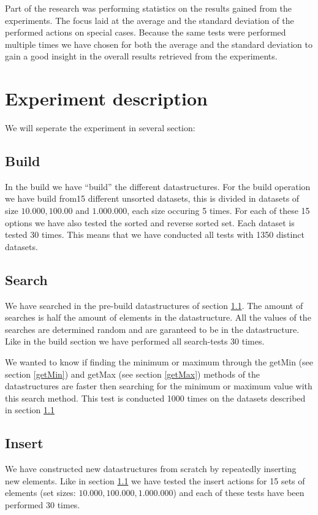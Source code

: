 \documentclass{article}
\begin{document}
Part of the research was performing statistics on the results gained from the experiments. The focus laid at the average and the standard deviation of the performed actions on special cases. Because the same tests were performed multiple times we have chosen for both the average and the standard deviation to gain a good insight in the overall results retrieved from the experiments. 

\section{Experiment description}
We will seperate the experiment in several section:
\subsection{Build}
\label{Build}
In the build we have ``build'' the different datastructures. 
For the build operation we have build from15 different unsorted datasets, this is divided in datasets of size $10.000, 100.00$ and $1.000.000$, each size occuring 5 times.  For each of these 15 options we have also tested the sorted and reverse sorted set. Each dataset is tested 30 times. This means that we have conducted all tests with 1350 distinct datasets.
\subsection{Search}
We have searched in the pre-build datastructures of section \ref{Build}. The amount of searches is half the amount of elements in the datastructure. All the values of the searches are determined random and are garanteed to be in the datastructure. Like in the build section we have performed all search-tests 30 times. 

We wanted to know if finding the minimum or maximum through the getMin (see section \ref{getMin}) and getMax (see section \ref{getMax}) methods of the datastructures are faster then searching for the minimum or maximum value with this search method. This test is conducted 1000 times on the datasets described in section \ref{Build}
\subsection{Insert}
We have constructed new datastructures from scratch by repeatedly inserting new elements. Like in section \ref{Build} we have tested the insert actions for 15 sets of elements (set sizes: $10.000, 100.000, 1.000.000$) and each of these tests have been performed 30 times.
\end{document}
